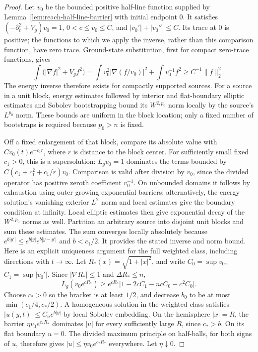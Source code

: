 \begin{proof}
Let $v_0$ be the bounded positive half-line function supplied by
Lemma~\ref{lem:reach-half-line-barrier} with initial endpoint $0$.
It satisfies $(-\partial_t^2+V_g)v_0=1$,
$0<c\le v_0\le C$, and $|v_0'|+|v_0''|\le C$.
Its trace at $0$ is positive; the functions to which we apply the
inverse, rather than this comparison function, have zero trace.
Ground-state substitution, first for compact zero-trace functions,
gives
\[
 \int\bigl(|\nabla f|^2+V_g f^2\bigr)
 =\int v_0^2|\nabla(f/v_0)|^2+\int v_0^{-1}f^2
 \ge C^{-1}\|f\|_2^2.
\]
The energy inverse therefore exists for compactly supported sources.
For a source in a unit block, energy estimates followed by interior
and flat-boundary elliptic estimates and Sobolev bootstrapping bound
its $W^{2,p_0}$ norm locally by the source's $L^{p_0}$ norm.  These
bounds are uniform in the block location; only a fixed number of
bootstraps is required because $p_0>n$ is fixed.

Off a fixed enlargement of that block, compare its absolute value
with $Cv_0(t)e^{-c_1 r}$, where $r$ is distance to the block center.
For sufficiently small fixed $c_1>0$, this is a supersolution:
$L_gv_0=1$ dominates the terms bounded by
$C(c_1+c_1^2+c_1/r)v_0$.  Comparison is valid after division by
$v_0$, since the divided operator has positive zeroth coefficient
$v_0^{-1}$.  On unbounded domains it follows by exhaustion using
outer growing exponential barriers; alternatively, the energy
solution's vanishing exterior $L^2$ norm and local estimates give
the boundary condition at infinity.  Local elliptic estimates then
give exponential decay of the $W^{2,p_0}$ norms as well.
Partition an arbitrary source into disjoint unit blocks and sum
these estimates.  The sum converges locally absolutely because
$e^{b|y'|}\le e^{b|y|}e^{b|y-y'|}$ and $b<c_1/2$.
It provides the stated inverse and norm bound.  Here is an explicit
uniqueness argument for the full weighted class, including directions
with $t\to\infty$.  Let $R_*(x)=\sqrt{1+|x|^2}$, and write
$C_0=\sup v_0$, $C_1=\sup|v_0'|$.  Since
$|\nabla R_*|\le1$ and $\Delta R_*\le n$,
\[
 L_g(v_0e^{cR_*})
 \ge e^{cR_*}\bigl[1-2cC_1-ncC_0-c^2C_0\bigr].
\]
Choose $c_*>0$ so the bracket is at least $1/2$, and decrease $b_0$
to be at most $\min(c_1/4,c_*/2)$.  A homogeneous solution in the
weighted class satisfies $|u(y,t)|\le C_u e^{b|y|}$ by local Sobolev
embedding.  On the hemisphere $|x|=R$, the barrier
$\eta v_0e^{c_*R_*}$ dominates $|u|$ for every sufficiently large
$R$, since $c_*>b$.  On its flat boundary $u=0$.  The divided
maximum principle on half-balls, for both signs of $u$, therefore
gives $|u|\le\eta v_0e^{c_*R_*}$ everywhere.  Let $\eta\downarrow0$.
\end{proof}

